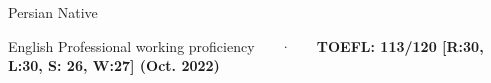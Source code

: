 
\begin{cvskills}

  \cvskill
    {Persian} %
    {Native} %

  
  \cvskill
    {English} %
    {Professional working proficiency ~~~·~~~ \textbf{TOEFL: 113/120 [R:30, L:30, S: 26, W:27] (Oct. 2022)}  } %

\end{cvskills}
